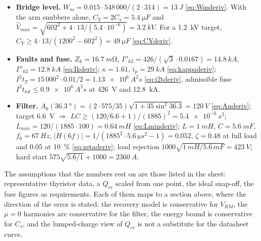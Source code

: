 \documentclass[10pt,a4paper]{scrartcl}
\newcommand{\iit}{I^{2}t}
\begin{document}
\begin{itemize}[leftmargin=*]
\item \textbf{Bridge level.} $W_m = 0.015\cdot548\,000/(2\cdot314) = \SI{13}{J}$ \eqref{eq:Wmderiv}. With the arm snubbers alone, $C_Y = 2C_s = \SI{5.4}{\micro F}$ and $\hat V_{max} = \sqrt{602^2 + 4\cdot13/(5.4\cdot10^{-6})} = \SI{3.2}{kV}$. For a \SI{1.2}{kV} target, $C_Y\ge4\cdot13/(1200^2-602^2) = \SI{49}{\micro F}$ \eqref{eq:CYderiv}.
\item \textbf{Faults and fuse.} $Z_k = \SI{16.7}{m\ohm}$, $I''_{k3} = 426/(\sqrt3\cdot0.0167) = \SI{14.8}{kA}$, $I''_{k2} = \SI{12.8}{kA}$ \eqref{eq:Ikderiv}; $\kappa = 1.61$, $i_p = \SI{29}{kA}$ \eqref{eq:kappaderiv}; $\iit_T = 15\,000^2\cdot0.01/2 = \SI{1.13e6}{A^2 s}$ \eqref{eq:i2tderiv}, admissible fuse $\iit_{tot}\le\SI{0.9e6}{A^2 s}$ at \SI{426}{V} and \SI{12.8}{kA}.
\item \textbf{Filter.} $A_6(\SI{36.3}{\degree}) = (2\cdot575/35)\sqrt{1+35\sin^2\!36.3} = \SI{120}{V}$ \eqref{eq:Anderiv}; target \SI{6.6}{V} $\Rightarrow$ $LC\ge(120/6.6+1)/(1885)^2 = \SI{5.4e-6}{s^2}$; $L_{min} = 120/(1885\cdot100) = \SI{0.64}{mH}$ \eqref{eq:Lminderiv}; $L = \SI{1}{mH}$, $C = \SI{5.6}{mF}$, $f_0 = \SI{67}{Hz}$, $|H(6f)| = 1/(1885^2\cdot5.6\,\si{\micro s^2}-1) = 0.052$, $\zeta = 0.48$ at full load and $0.05$ at \SI{10}{\percent} \eqref{eq:zetaderiv}; load rejection $1000\sqrt{1\,\si{mH}/5.6\,\si{mF}} = \SI{423}{V}$; hard start $575\sqrt{5.6/1} + 1000 = \SI{2360}{A}$.
\end{itemize}
The assumptions that the numbers rest on are those listed in the sheet: representative thyristor data, a $Q_{rr}$ scaled from one point, the ideal snap-off, the fuse figures as requirements. Each of them maps to a section above, where the direction of the error is stated: the recovery model is conservative for $V_{RM}$, the $\mu = 0$ harmonics are conservative for the filter, the energy bound is conservative for $C_s$, and the lumped-charge view of $Q_{rr}$ is not a substitute for the datasheet curve.
\end{document}
